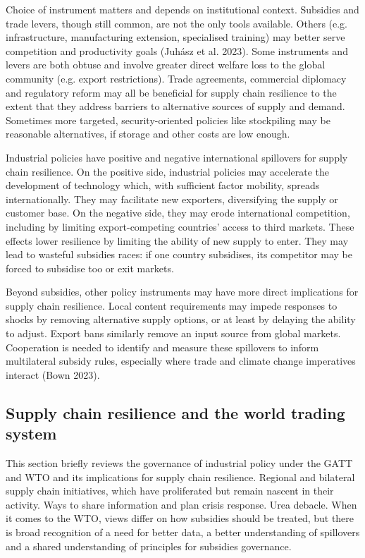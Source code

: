 \documentclass{article}
\begin{document}
Choice of instrument matters and depends on institutional context. Subsidies and trade levers, though still common, are not the only tools available. Others (e.g. infrastructure, manufacturing extension, specialised training) may better serve competition and productivity goals (Juhász et al. 2023). Some instruments and levers are both obtuse and involve greater direct welfare loss to the global community (e.g. export restrictions). Trade agreements, commercial diplomacy and regulatory reform may all be beneficial for supply chain resilience to the extent that they address barriers to alternative sources of supply and demand. Sometimes more targeted, security-oriented policies like stockpiling may be reasonable alternatives, if storage and other costs are low enough.

Industrial policies have positive and negative international spillovers for supply chain resilience. On the positive side, industrial policies may accelerate the development of technology which, with sufficient factor mobility, spreads internationally. They may facilitate new exporters, diversifying the supply or customer base. On the negative side, they may erode international competition, including by limiting export-competing countries’ access to third markets. These effects lower resilience by limiting the ability of new supply to enter. They may lead to wasteful subsidies races: if one country subsidises, its competitor may be forced to subsidise too or exit markets.

Beyond subsidies, other policy instruments may have more direct implications for supply chain resilience. Local content requirements may impede responses to shocks by removing alternative supply options, or at least by delaying the ability to adjust. Export bans similarly remove an input source from global markets. Cooperation is needed to identify and measure these spillovers to inform multilateral subsidy rules, especially where trade and climate change imperatives interact (Bown 2023).

\subsection{Supply chain resilience and the world trading system}

This section briefly reviews the governance of industrial policy under the GATT and WTO and its implications for supply chain resilience. Regional and bilateral supply chain initiatives, which have proliferated but remain nascent in their activity. Ways to share information and plan crisis response. Urea debacle. When it comes to the WTO, views differ on how subsidies should be treated, but there is broad recognition of a need for better data, a better understanding of spillovers and a shared understanding of principles for subsidies governance.
\end{document}
